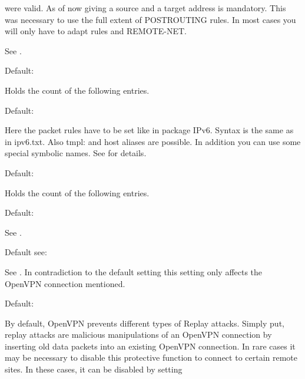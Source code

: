 \begin{description}
  were valid. As of now giving a source and a target address is mandatory. 
  This was necessary to use the full extent of POSTROUTING rules. In most cases 
  you will only have to adapt rules  and REMOTE-NET.

  See .


  Default: 

  Holds the count of the following  entries.


  Default: 

  Here the packet rules have to be set like in package IPv6. Syntax is 
  the same as in ipv6.txt. Also tmpl: and host aliases are possible. In addition 
  you can use some special symbolic names. 
  See  for details.


  Default: 

  Holds the count of the following  entries.


  Default: 

  See .


  Default see: 

  See . 
  In contradiction to the default setting this setting only affects the OpenVPN 
  connection mentioned.


  Default: 

  By default, OpenVPN prevents different types of Replay attacks.
  Simply put, replay attacks are  malicious manipulations of an OpenVPN connection
  by inserting old data packets into an existing OpenVPN connection. In 
  rare cases it may be necessary to disable this protective function 
  to connect to certain remote sites. In these cases, it can be disabled by setting
  

\end{description}

